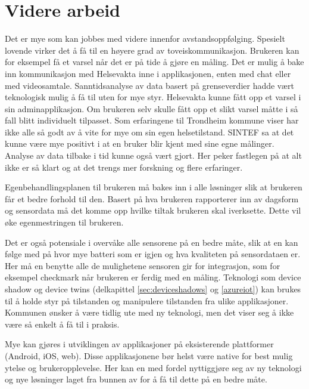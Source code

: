 \section{Videre arbeid}
Det er mye som kan jobbes med videre innenfor avstandsoppfølging. Spesielt lovende virker det å få til
en høyere grad av toveiskommunikasjon. Brukeren kan for eksempel få et varsel når det er på tide å gjøre en måling.
Det er mulig å bake inn kommunikasjon med Helsevakta inne i applikasjonen, enten med chat eller med videosamtale.
Sanntidsanalyse av data basert på grenseverdier hadde vært teknologisk mulig å få til uten for mye styr. Helsevakta
kunne fått opp et varsel i sin adminapplikasjon. Om brukeren selv skulle fått opp et slikt varsel måtte i så fall blitt
individuelt tilpasset.
Som erfaringene til Trondheim kommune viser har ikke alle så godt av å vite for mye om sin egen
helsetilstand. SINTEF sa at det kunne være mye positivt i at en bruker blir kjent med sine egne målinger.
Analyse av data tilbake i tid kunne også vært gjort. Her peker fastlegen på at alt ikke er så klart og
at det trengs mer forskning og flere erfaringer.

Egenbehandlingsplanen til brukeren må bakes inn i alle løsninger slik at brukeren får et bedre forhold til den.
Basert på hva brukeren rapporterer inn av dagsform og sensordata må det komme opp hvilke tiltak brukeren skal
iverksette. Dette vil øke egenmestringen til brukeren.

Det er også potensiale i overvåke alle sensorene på en bedre måte, slik at en kan følge med på hvor mye batteri som er igjen
og hva kvaliteten på sensordataen er. Her må en benytte alle de mulighetene sensoren gir for integrasjon, som for eksempel
checkmark når brukeren er ferdig med en måling. Teknologi som device shadow og device twins (delkapittel \ref{sec:deviceshadows}
og \ref{azureiot}) kan brukes til å holde styr på tilstanden og manipulere tilstanden fra ulike applikasjoner.
Kommunen ønsker å være tidlig ute med
ny teknologi, men det viser seg å ikke være så enkelt å få til i praksis.

Mye kan gjøres i utviklingen av applikasjoner på eksisterende plattformer (Android, iOS, web). Disse applikasjonene bør helst være native for best
mulig ytelse og brukeropplevelse. Her kan en med fordel nyttiggjøre seg av ny teknologi og nye løsninger laget fra bunnen av for å få til dette på en bedre måte.
